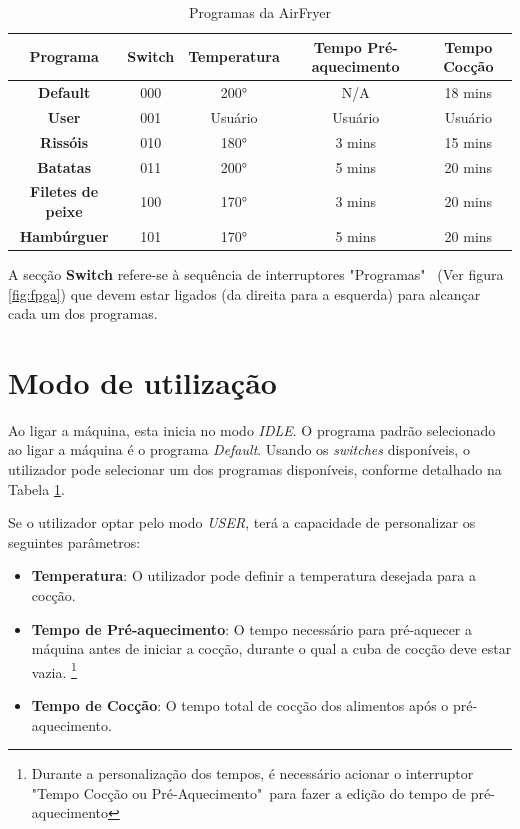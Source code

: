 \documentclass[a4paper, 11pt, onecolumn, oneside]{report}
\begin{document}
\begin{table}[H]
\centering
\begin{tabular}{|c|c|c|c|c|}
\hline
\textbf{Programa} & \textbf{Switch} & \textbf{Temperatura} & \textbf{Tempo Pré-aquecimento} & \textbf{Tempo Cocção} \\ \hline
\textbf{Default}           & 000 & 200°    & N/A       & 18 mins    \\ \hline
\textbf{User}              & 001 & Usuário & Usuário   & Usuário    \\ \hline
\textbf{Rissóis}           & 010 & 180°    & 3 mins    & 15 mins    \\ \hline
\textbf{Batatas}           & 011 & 200°    & 5 mins    & 20 mins    \\ \hline
\textbf{Filetes de peixe}  & 100 & 170°    & 3 mins    & 20 mins    \\ \hline
\textbf{Hambúrguer}        & 101 & 170°    & 5 mins    & 20 mins    \\ \hline
\end{tabular}
\caption{Programas da AirFryer}
\label{tab:programas}
\end{table}
\par

A secção \textbf{Switch} refere-se à sequência de interruptores "Programas" \ (Ver figura \ref{fig:fpga}) que devem estar ligados (da direita para a esquerda) para alcançar cada um dos programas.

\section{Modo de utilização}
Ao ligar a máquina, esta inicia no modo \textit{IDLE}. O programa padrão selecionado ao ligar a máquina é o programa \textit{Default}. Usando os \textit{switches} disponíveis, o utilizador pode selecionar um dos programas disponíveis, conforme detalhado na Tabela \ref{tab:programas}.

Se o utilizador optar pelo modo \textit{USER}, terá a capacidade de personalizar os seguintes parâmetros:
\begin{itemize}
    \item \textbf{Temperatura}: O utilizador pode definir a temperatura desejada para a cocção.
    \item \textbf{Tempo de Pré-aquecimento}: O tempo necessário para pré-aquecer a máquina antes de iniciar a cocção, durante o qual a cuba de cocção deve estar vazia. \footnote{Durante a personalização dos tempos, é necessário acionar o interruptor "Tempo Cocção ou Pré-Aquecimento"\ para fazer a edição do tempo de pré-aquecimento}
    \item \textbf{Tempo de Cocção}: O tempo total de cocção dos alimentos após o pré-aquecimento.
\end{itemize}
  
\end{document}

